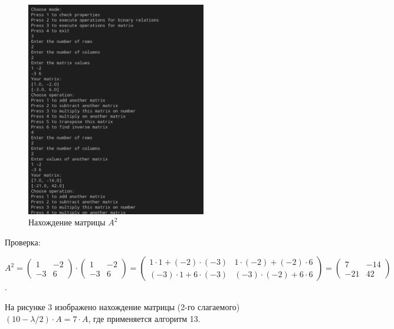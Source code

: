 \documentclass[bachelor, och, labwork]{shiza}
\begin{document}
        \begin{figure}[H]
            \centering
            \includegraphics[width=0.7\textwidth]{photo/2.png}
            \caption{Нахождение матрицы $A^2$}
        \end{figure}

        Проверка:
        
        $A^2 = 
        \begin{pmatrix}
            1 & -2 \\
            -3 & 6
        \end{pmatrix} \cdot 
        \begin{pmatrix}
            1 & -2 \\
            -3 & 6
        \end{pmatrix} =
        \begin{pmatrix}
            1 \cdot 1 + (-2) \cdot (-3) & 1 \cdot (-2) + (-2) \cdot 6 \\
            (-3) \cdot 1 + 6 \cdot (-3) & (-3) \cdot (-2) + 6 \cdot 6
        \end{pmatrix} =
        \begin{pmatrix}
            7 & -14 \\
            -21 & 42
        \end{pmatrix}$.

        На рисунке 3 изображено нахождение матрицы (2-го слагаемого) $(10 - \lambda / 2) \cdot A = 7 \cdot A$, где применяется алгоритм 13.
    
\end{document}
